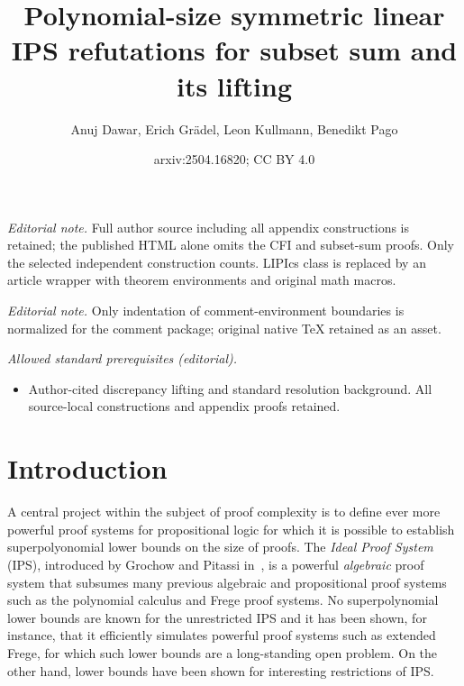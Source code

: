 \documentclass[10pt,a4paper]{article}
\title{Polynomial-size symmetric linear IPS refutations for subset sum and its lifting}
\author{Anuj Dawar, Erich Grädel, Leon Kullmann, Benedikt Pago}
\date{arxiv:2504.16820; CC BY 4.0}
\begin{document}
\maketitle
\noindent\textit{Editorial note.} Full author source including all appendix constructions is retained; the published HTML alone omits the CFI and subset-sum proofs. Only the selected independent construction counts. LIPIcs class is replaced by an article wrapper with theorem environments and original math macros.\par\medskip
\noindent\textit{Editorial note.} Only indentation of comment-environment boundaries is normalized for the comment package; original native TeX retained as an asset.\par\medskip
\noindent\textit{Allowed standard prerequisites (editorial).}\begin{itemize}
\item Author-cited discrepancy lifting and standard resolution background. All source-local constructions and appendix proofs retained.
\end{itemize}\medskip
	\section{Introduction}
	A central project within the subject of proof complexity \cite{pitassi, segerlind, krajicekBook} is to define ever more powerful proof systems for propositional logic for which it is possible to establish superpolyonomial lower bounds on the size of proofs. The \emph{Ideal Proof System} (IPS), introduced by Grochow and Pitassi in~\cite{IPS}, is a powerful \emph{algebraic} proof system that subsumes many previous algebraic and propositional proof systems such as the polynomial calculus and Frege proof systems. No superpolynomial lower bounds are known for the unrestricted IPS and it has been shown, for instance, that it efficiently simulates powerful proof systems such as extended Frege, for which such lower bounds are a long-standing open problem.  On the other hand, lower bounds have been shown for interesting restrictions of IPS.
	
\end{document}
